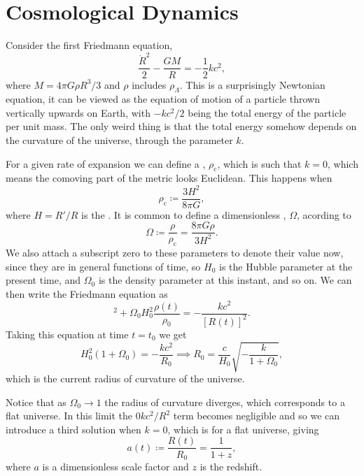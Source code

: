 \documentclass[fleqn]{NotesClass}
\begin{document}
    \section{Cosmological Dynamics}
    Consider the first Friedmann equation,
    \begin{equation}
        \frac{\dot{R}^2}{2} - \frac{GM}{R} = -\frac{1}{2}kc^2,
    \end{equation}
    where \(M = 4\pi G\rho R^3/3\) and \(\rho\) includes \(\rho_{\Lambda}\).
    This is a surprisingly Newtonian equation, it can be viewed as the equation of motion of a particle thrown vertically upwards on Earth, with \(-kc^2/2\) being the total energy of the particle per unit mass.
    The only weird thing is that the total energy somehow depends on the curvature of the universe, through the parameter \(k\).
    
    For a given rate of expansion we can define a , \(\rho_{\mathrm{c}}\), which is such that \(k = 0\), which means the comoving part of the metric looks Euclidean.
    This happens when
    \begin{equation}
        \rho_{\mathrm{c}} \coloneqq \frac{3H^2}{8\pi G},
    \end{equation}
    where \(H = R'/R\) is the .
    It is common to define a dimensionless , \(\Omega\), acording to
    \begin{equation}
        \Omega \coloneqq \frac{\rho}{\rho_{\mathrm{c}}} = \frac{8\pi G\rho}{3H^2}.
    \end{equation}
    We also attach a subscript zero to these parameters to denote their value now, since they are in general functions of time, so \(H_0\) is the Hubble parameter at the present time, and \(\Omega_0\) is the density parameter at this instant, and so on.
    We can then write the Friedmann equation as
    \begin{equation}
        [H(t)]^2 + \Omega_0H_0^2 \frac{\rho(t)}{\rho_0} = -\frac{kc^2}{[R(t)]^2}.
    \end{equation}
    Taking this equation at time \(t = t_0\) we get
    \begin{equation}
        H_0^2(1 + \Omega_0) = -\frac{kc^2}{R_0} \implies R_0 = \frac{c}{H_0}\sqrt{-\frac{k}{1 + \Omega_0}},
    \end{equation}
    which is the current radius of curvature of the universe.
    
    Notice that as \(\Omega_0 \to 1\) the radius of curvature diverges, which corresponds to a flat universe.
    In this limit the \(0kc^2/R^2\) term becomes negligible and so we can introduce a third solution when \(k = 0\), which is for a flat universe, giving
    \begin{equation}
        a(t) \coloneqq \frac{R(t)}{R_0} = \frac{1}{1 + z},
    \end{equation}
    where \(a\) is a dimensionless scale factor and \(z\) is the redshift.
    
\end{document}
